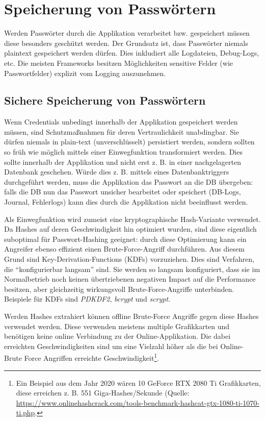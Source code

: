 \section{Speicherung von Passwörtern}
\label{password_storage}

Werden Passwörter durch die Applikation verarbeitet bzw. gespeichert müssen diese besonders geschützt werden. Der Grundsatz ist, dass Passwörter niemals plaintext gespeichert werden dürfen. Dies inkludiert alle Logdateien, Debug-Logs, etc. Die meisten Frameworks besitzen Möglichkeiten sensitive Felder (wie Passwortfelder) explizit vom Logging auszunehmen.

\subsection{Sichere Speicherung von Passwörtern}

Wenn Credentials unbedingt innerhalb der Applikation gespeichert werden müssen, sind Schutzmaßnahmen für deren Vertraulichkeit unabdingbar. Sie dürfen niemals in plain-text (unverschlüsselt) persistiert werden, sondern sollten so früh wie möglich mittels einer Einwegfunktion transformiert werden. Dies sollte innerhalb der Applikation und nicht erst z. B. in einer nachgelagerten Datenbank geschehen. Würde dies z. B. mittels eines Datenbanktriggers durchgeführt werden, muss die Applikation das Passwort an die DB übergeben: falls die DB nun das Passwort unsicher bearbeitet oder speichert (DB-Logs, Journal, Fehlerlogs) kann dies durch die Applikation nicht beeinflusst werden.

Als Einwegfunktion wird zumeist eine kryptographische Hash-Variante verwendet. Da Hashes auf deren Geschwindigkeit hin optimiert wurden, sind diese eigentlich suboptimal für Passwort-Hashing geeignet: durch diese Optimierung kann ein Angreifer ebenso effizient einen Brute-Force-Angriff durchführen. Aus diesem Grund sind Key-Derivation-Functions (KDFs) vorzuziehen. Dies sind Verfahren, die ``konfigurierbar langsam'' sind. Sie werden so langsam konfiguriert, dass sie im Normalbetrieb noch keinen übertriebenen negativen Impact auf die Performance besitzen, aber gleichzeitig wirkungsvoll Brute-Force-Angriffe unterbinden. Beispiele für KDFs sind \textit{PDKDF2}, \textit{bcrypt} und \textit{scrypt}.

Werden Hashes extrahiert können offline Brute-Force Angriffe gegen diese Hashes verwendet werden. Diese verwenden meistens multiple Grafikkarten und benötigen keine online Verbindung zu der Online-Applikation. Die dabei erreichten Geschwindigkeiten sind um eine Vielzahl höher als die bei Online-Brute Force Angriffen erreichte Geschwindigkeit\footnote{Ein Beispiel aus dem Jahr 2020 wären 10 GeForce RTX 2080 Ti Grafikkarten, diese erreichen z. B. 551 Giga-Hashes/Sekunde (Quelle: \url{https://www.onlinehashcrack.com/tools-benchmark-hashcat-gtx-1080-ti-1070-ti.php}.}.


